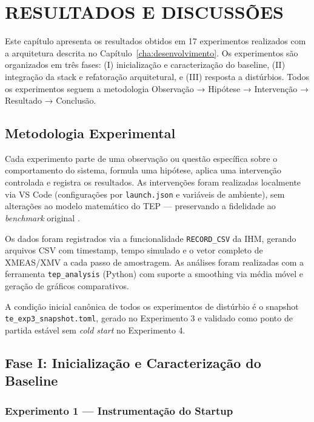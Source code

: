 \chapter{RESULTADOS E DISCUSSÕES}
\label{cha:resultados}

Este capítulo apresenta os resultados obtidos em 17 experimentos realizados com a arquitetura descrita no Capítulo~\ref{cha:desenvolvimento}. Os experimentos são organizados em três fases: (I) inicialização e caracterização do baseline, (II) integração da stack e refatoração arquitetural, e (III) resposta a distúrbios. Todos os experimentos seguem a metodologia Observação → Hipótese → Intervenção → Resultado → Conclusão.

\section{Metodologia Experimental}
\label{sec:metodologia}

Cada experimento parte de uma observação ou questão específica sobre o comportamento do sistema, formula uma hipótese, aplica uma intervenção controlada e registra os resultados. As intervenções foram realizadas localmente via VS Code (configurações por \texttt{launch.json} e variáveis de ambiente), sem alterações ao modelo matemático do TEP — preservando a fidelidade ao \textit{benchmark} original \cite{DOWNS1993}.

Os dados foram registrados via a funcionalidade \texttt{RECORD\_CSV} da IHM, gerando arquivos CSV com timestamp, tempo simulado e o vetor completo de XMEAS/XMV a cada passo de amostragem. As análises foram realizadas com a ferramenta \texttt{tep\_analysis} (Python) com suporte a smoothing via média móvel e geração de gráficos comparativos.

A condição inicial canônica de todos os experimentos de distúrbio é o snapshot \texttt{te\_exp3\_snapshot.toml}, gerado no Experimento 3 e validado como ponto de partida estável sem \textit{cold start} no Experimento 4.

\section{Fase I: Inicialização e Caracterização do Baseline}
\label{sec:fase1}

\subsection{Experimento 1 — Instrumentação do Startup}


